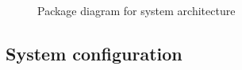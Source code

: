 \documentclass{article}
\begin{document}
\vspace{2em}
\begin{figure}[h]
\centering
{}
\caption{Package diagram for system architecture}
\end{figure}

\subsection{System configuration}
\end{document}
